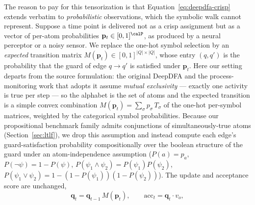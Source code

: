 The reason to pay for this tensorization is that Equation~\eqref{eq:deepdfa-crisp} extends verbatim to \emph{probabilistic} observations, which the symbolic walk cannot represent. Suppose a time point is delivered not as a crisp assignment but as a vector of per-atom probabilities $\mathbf{p}_t \in [0,1]^{\calP}$, as produced by a neural perceptor or a noisy sensor. We replace the one-hot symbol selection by an \emph{expected} transition matrix $M(\mathbf{p}_t) \in [0,1]^{|Q| \times |Q|}$, whose entry $(q, q')$ is the probability that the guard of edge $q \to q'$ is satisfied under $\mathbf{p}_t$. Here our setting departs from the source formulation: the original DeepDFA and the process-monitoring work that adopts it assume \emph{mutual exclusivity} --- exactly one activity is true per step --- so the alphabet is the set of atoms and the expected transition is a simple convex combination $M(\mathbf{p}_t) = \sum_\sigma p_\sigma\, T_\sigma$ of the one-hot per-symbol matrices, weighted by the categorical symbol probabilities. Because our propositional benchmark family admits conjunctions of simultaneously-true atoms (Section~\ref{sec:ltlf}), we drop this assumption and instead compute each edge's guard-satisfaction probability compositionally over the boolean structure of the guard under an atom-independence assumption ($P(a) = p_a$, $P(\lnot \psi) = 1 - P(\psi)$, $P(\psi_1 \land \psi_2) = P(\psi_1)P(\psi_2)$, $P(\psi_1 \lor \psi_2) = 1 - (1 - P(\psi_1))(1 - P(\psi_2))$). The update and acceptance score are unchanged,
\begin{equation}
  \mathbf{q}_t = \mathbf{q}_{t-1}\, M(\mathbf{p}_t),
  \qquad
  \mathrm{acc}_t = \mathbf{q}_t \cdot v_o,
  \label{eq:deepdfa-soft}
\end{equation}
